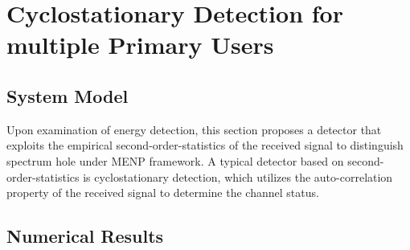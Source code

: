 \section{Cyclostationary Detection for multiple Primary Users}
\subsection{System Model}
Upon examination of energy detection, this section proposes a detector that exploits the empirical second-order-statistics of the received signal to distinguish spectrum hole under MENP framework. A typical detector based on second-order-statistics is cyclostationary detection, which  utilizes the auto-correlation property of the received signal to determine the channel status.  
\subsection{Numerical Results}

